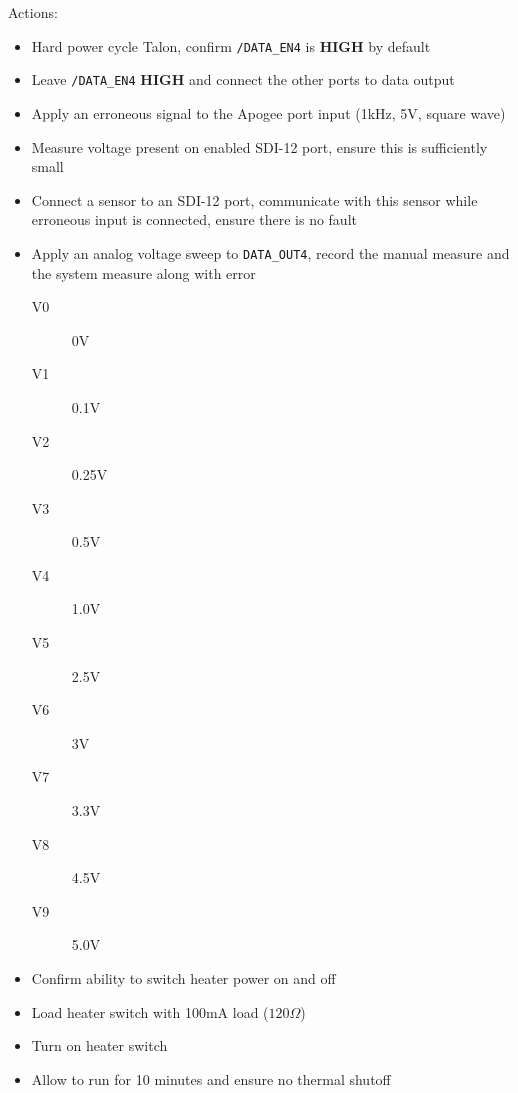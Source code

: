 {\large Actions:}
\begin{itemize}
\item Hard power cycle Talon, confirm \texttt{/DATA\_EN4} is \textbf{HIGH} by default
\item Leave \texttt{/DATA\_EN4} \textbf{HIGH} and connect the other ports to data output
\item Apply an erroneous signal to the Apogee port input (1kHz, 5V, square wave)
\item Measure voltage present on enabled SDI-12 port, ensure this is sufficiently small
\item Connect a sensor to an SDI-12 port, communicate with this sensor while erroneous input is connected, ensure there is no fault 
\item Apply an analog voltage sweep to \texttt{DATA\_OUT4}, record the manual measure and the system measure along with error
\begin{description}
\item[V0] 0V
\item[V1] 0.1V
\item[V2] 0.25V
\item[V3] 0.5V
\item[V4] 1.0V
\item[V5] 2.5V
\item[V6] 3V
\item[V7] 3.3V
\item[V8] 4.5V
\item[V9] 5.0V
\end{description}
\item Confirm ability to switch heater power on and off
\item Load heater switch with 100mA load ($120\Omega$)
\item Turn on heater switch
\item Allow to run for 10 minutes and ensure no thermal shutoff

\end{itemize}

